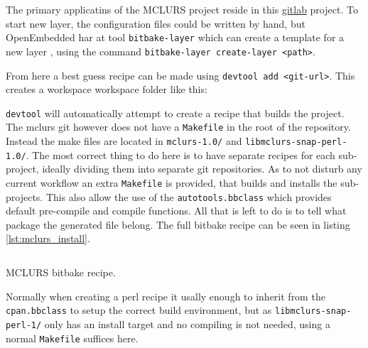 \documentclass[../../main.tex]{subfiles}
\begin{document}
The primary applicatins of the MCLURS project reside in this
\href{https://gitlab.com/esrl/mclurs.git }{gitlab} project.
To start new layer, the configuration files could be written by hand, but
OpenEmbedded har at tool \texttt{bitbake-layer} which can create
a template for a new layer , using the command \texttt{bitbake-layer create-layer <path>}. 

From here a best guess recipe can be made using \texttt{devtool add <git-url>}.
This creates a workspace workspace folder like this:

\texttt{devtool} will automatically attempt to create a recipe that builds the project.
The mclurs git however does not have a \texttt{Makefile} in the root of the repository.
Instead the make files are located in \texttt{mclurs-1.0/} and
\texttt{libmclurs-snap-perl-1.0/}.
The most correct thing to do here is to have separate recipes for each sub-project, ideally
dividing them into separate git repositories.
As to not disturb any current workflow an extra \texttt{Makefile} is provided, that
builds and installs the sub-projects. This also allow the use of the
\texttt{autotools.bbclass} which provides default pre-compile and compile functions.
All that is left to do is to tell what package the generated file belong.
The full bitbake recipe can be seen in listing \ref{lst:mclurs_install}.

\begin{listing}
	\inputminted[firstline=13]{bitbake}{/home/aske/Bachelor/mender-raspberrypi/meta-mclurs/recipes-mclurs/mclurs/mclurs_git.bb}
\caption{MCLURS bitbake recipe.}
\label{lst:mclurs_install}
\end{listing}

Normally when creating a perl recipe it usally enough to inherit from the
\texttt{cpan.bbclass} to setup the correct build environment, but as
\texttt{libmclurs-snap-perl-1/} only has an install target and no compiling
is not needed, using a normal \texttt{Makefile} suffices here.\\
\end{document}
